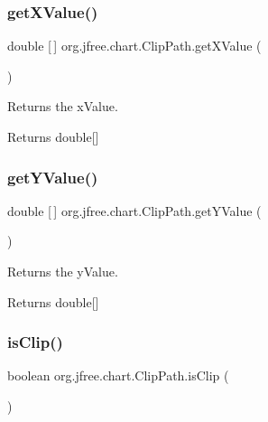 \subsubsection{\texorpdfstring{get\+X\+Value()}{getXValue()}}
{\footnotesize\ttfamily double \mbox{[}$\,$\mbox{]} org.\+jfree.\+chart.\+Clip\+Path.\+get\+X\+Value (\begin{DoxyParamCaption}{ }\end{DoxyParamCaption})}

Returns the x\+Value.

\begin{DoxyReturn}{Returns}
double\mbox{[}\mbox{]} 
\end{DoxyReturn}
\mbox{\label{classorg_1_1jfree_1_1chart_1_1_clip_path_a580e1b4b1dd07b839201efd41d2be572}} 
\subsubsection{\texorpdfstring{get\+Y\+Value()}{getYValue()}}
{\footnotesize\ttfamily double \mbox{[}$\,$\mbox{]} org.\+jfree.\+chart.\+Clip\+Path.\+get\+Y\+Value (\begin{DoxyParamCaption}{ }\end{DoxyParamCaption})}

Returns the y\+Value.

\begin{DoxyReturn}{Returns}
double\mbox{[}\mbox{]} 
\end{DoxyReturn}
\mbox{\label{classorg_1_1jfree_1_1chart_1_1_clip_path_a037cf5d915c8865eaca7211c08dd1ba0}} 
\subsubsection{\texorpdfstring{is\+Clip()}{isClip()}}
{\footnotesize\ttfamily boolean org.\+jfree.\+chart.\+Clip\+Path.\+is\+Clip (\begin{DoxyParamCaption}{ }\end{DoxyParamCaption})}

